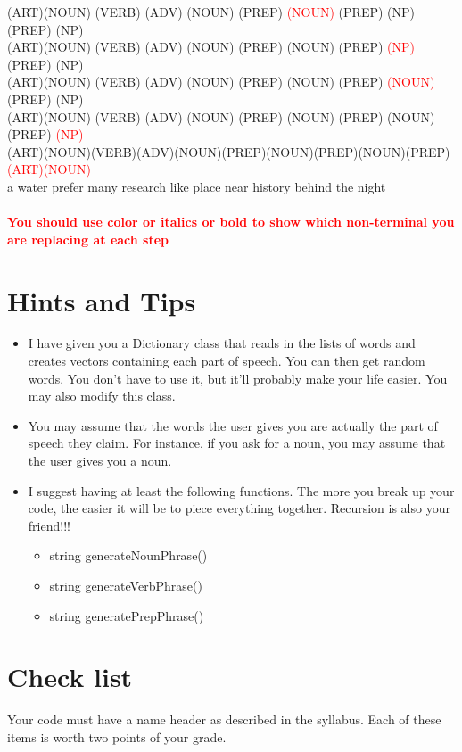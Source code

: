\documentclass[11pt]{article}
\begin{document}
(ART)(NOUN) (VERB) (ADV) (NOUN) (PREP) \textcolor{red}{(NOUN)} (PREP) (NP) (PREP) (NP)\\
(ART)(NOUN) (VERB) (ADV) (NOUN) (PREP) (NOUN) (PREP) \textcolor{red}{(NP)} (PREP) (NP)\\
(ART)(NOUN) (VERB) (ADV) (NOUN) (PREP) (NOUN) (PREP) \textcolor{red}{(NOUN)} (PREP) (NP)\\
(ART)(NOUN) (VERB) (ADV) (NOUN) (PREP) (NOUN) (PREP) (NOUN) (PREP) \textcolor{red}{(NP)}\\
(ART)(NOUN)(VERB)(ADV)(NOUN)(PREP)(NOUN)(PREP)(NOUN)(PREP)\textcolor{red}{(ART)(NOUN)}\\
a      water  prefer many  research  like   place   near  history   behind  the    night\\

\hfill\\ \textcolor{red}{\textbf{You should use color or italics or bold to show which
  non-terminal you are replacing at each step}}

\newpage
\section*{Hints and Tips}
\begin{itemize}
\item
  I have given you a Dictionary class that reads in the lists of words
  and creates vectors containing each part of speech. You can then get
  random words.  You don't have to use it, but it'll probably make your
  life easier.  You may also modify this class.
\item
  You may assume that the words the user gives you are actually the
  part of speech they claim.  For instance, if you ask for a noun, you
  may assume that the user gives you a noun.
\item
  I suggest having at least the following functions.  The more you
  break up your code, the easier it will be to piece everything
  together.  Recursion is also your friend!!!
  \begin{itemize}
  \item
    string generateNounPhrase()
  \item
    string generateVerbPhrase()
  \item
    string generatePrepPhrase()
  \end{itemize}
  
\end{itemize}


\section*{Check list}
Your code must have a name header as described in the syllabus.
Each of these items is worth two points of your grade.
\end{document}

